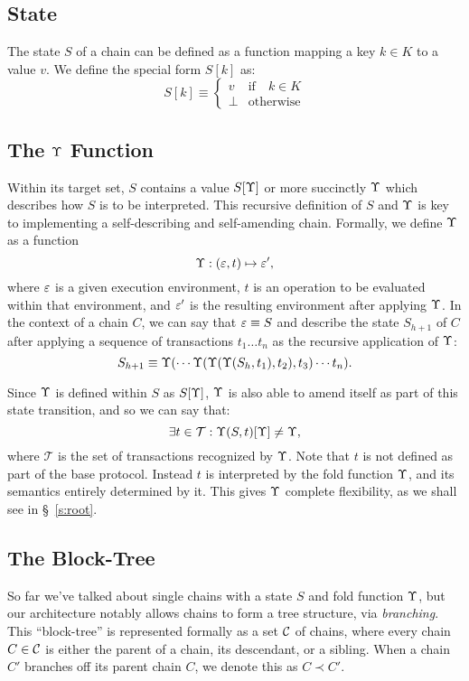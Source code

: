 \subsection{State}

The state $S$ of a chain can be defined as a function mapping a key $k \in K$ to a
value $v$. We define the special form $S[k]$ as:
\[
    S[k] \equiv \begin{cases}
        v                   & \text{if} \quad k \in K \\
        \bot                & \text{otherwise}
    \end{cases}
\]

\subsection{The $\Upsilon$ Function} \label{fold-function}

Within its target set, $S$ contains a value $S[\Upsilon]$ or more succinctly
$\Upsilon$ which describes how $S$ is to be interpreted. This recursive definition
of $S$ and $\Upsilon$ is key to implementing a self-describing and self-amending
chain. Formally, we define $\Upsilon$ as a function
\[
    \Upsilon : (\varepsilon, t) \mapsto \varepsilon',
\]
where $\varepsilon$ is a given execution environment, $t$ is an operation to be
evaluated within that environment, and $\varepsilon'$ is the resulting environment
after applying $\Upsilon$.  In the context of a chain $C$, we can say that $\varepsilon
\equiv S$ and describe the state $S_{h+1}$ of $C$ after applying a
sequence of transactions $t_1 \dots t_n$ as the recursive application of $\Upsilon$:
\[
    S_{h+1} \equiv \Upsilon(\cdots \Upsilon(\Upsilon(\Upsilon(S_h,
    t_1), t_2), t_3) \cdots t_n).
\]

Since $\Upsilon$ is defined within $S$ as $S[\Upsilon]$, $\Upsilon$ is also
able to amend itself as part of this state transition, and so we can say that:
\[
    \exists t \in \mathcal{T} : \Upsilon(S, t)[\Upsilon] \neq \Upsilon,
\]
where $\mathcal{T}$ is the set of transactions recognized by $\Upsilon$.  Note
that $t$ is not defined as part of the base protocol. Instead $t$ is
interpreted by the fold function $\Upsilon$, and its semantics entirely determined
by it. This gives $\Upsilon$ complete flexibility, as we shall see in
\S~\ref{s:root}.

\subsection{The Block-Tree}

So far we've talked about single chains with a state $S$ and fold function
$\Upsilon$, but our architecture notably allows chains to form a tree structure,
via \emph{branching}. This ``block-tree'' is represented formally as a set
$\mathcal{C}$ of chains, where every chain $C \in \mathcal{C}$ is either the parent of a
chain, its descendant, or a sibling. When a chain $C'$ branches off its parent
chain $C$, we denote this as $C \prec C'$.

